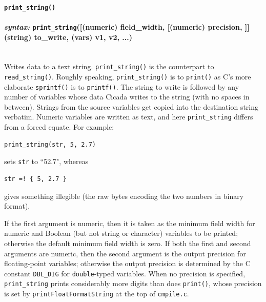 \documentclass{article}
\newenvironment{code}{
       \begin{list}{}{
               \setlength{\leftmargin}{.4in}
               \setlength{\rightmargin}{0in}
               \setlength{\topsep}{.2in}
       }
       \small
       \item[] }
       { \end{list}   }
\begin{document}
 






\paragraph{\texttt{print\_string()}\\\\
\normalfont \emph{syntax: } \texttt{print\_string}([(numeric) field\_width, [(numeric) precision, ]] (string) to\_write, (vars) v1, v2, ...)\\\\}
  

Writes data to a text string.  \texttt{print\_string()} is the counterpart to \texttt{read\_string()}.  Roughly speaking, \texttt{print\_string()} is to \texttt{print()} as C's more elaborate \texttt{sprintf()} is to \texttt{printf()}.  The string to write is followed by any number of variables whose data Cicada writes to the string (with no spaces in between).  Strings from the source variables get copied into the destination string verbatim.  Numeric variables are written as text, and here \texttt{print\_string} differs from a forced equate.  For example: 

\begin{code} \begin{verbatim}
print_string(str, 5, 2.7)
\end{verbatim} \end{code}

\noindent sets \texttt{str} to ``52.7", whereas

\begin{code} \begin{verbatim}
str =! { 5, 2.7 }
\end{verbatim} \end{code}

\noindent gives something illegible (the raw bytes encoding the two numbers in binary format).

If the first argument is numeric, then it is taken as the minimum field width for numeric and Boolean (but not string or character) variables to be printed; otherwise the default minimum field width is zero.  If both the first and second arguments are numeric, then the second argument is the output precision for floating-point variables; otherwise the output precision is determined by the C constant \texttt{DBL\_DIG} for \texttt{double}-typed variables.  When no precision is specified, \texttt{print\_string} prints considerably more digits than does \texttt{print()}, whose precision is set by \verb#printFloatFormatString# at the top of \verb#cmpile.c#.\\
\end{document}
